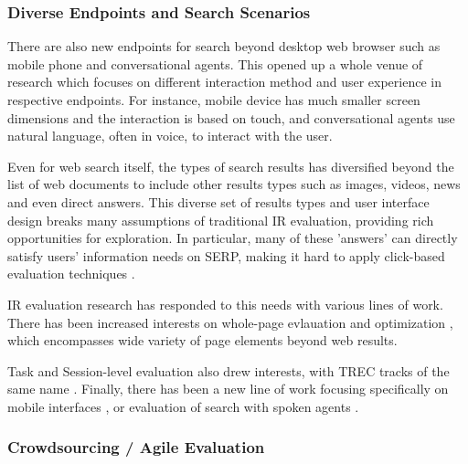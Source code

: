 \documentclass[openany]{now} %
\newcommand{\authornote}[3]{\marginpar{\tiny\color{#1}#2: #3}{\color{#1}{$\star$}}}
\newcommand{\emine}[1]{\authornote{green}{Emine}{#1}}
\newcommand{\note}[1]{\textit{(#1)}}
\begin{document}

\subsubsection{Diverse Endpoints and Search Scenarios}

There are also new endpoints for search beyond desktop web browser such as mobile phone and conversational agents. This opened up a whole venue of research which focuses on different interaction method and user experience in respective endpoints. For instance, mobile device has much smaller screen dimensions and the interaction is based on touch, and conversational agents use natural language, often in voice, to interact with the user.

Even for web search itself, the types of search results has diversified beyond the list of web documents to include other results types such as images, videos, news and even direct answers. This diverse set of results types and user interface design breaks many assumptions of traditional IR evaluation, providing rich opportunities for exploration. In particular, many of these 'answers' can directly satisfy users' information needs on SERP, making it hard to apply click-based evaluation techniques \cite{Li2009GA} \cite{diriye2012leaving}.

IR evaluation research has responded to this needs with various lines of work. There has been increased\emine{} interests on whole-page evlauation and optimization \cite{Zhou:2012}, which encompasses wide variety of page elements beyond web results. %

Task and Session-level evaluation \cite{KanoulasCCS11, CarteretteKHC14} also drew interests, with TREC tracks of the same name \cite{carterette2014overview}. Finally, there has been a new line of work focusing specifically on mobile interfaces \cite{VermaYC16}, or evaluation of search with spoken agents \cite{Kiseleva:2016}.

\subsubsection{Crowdsourcing / Agile Evaluation}
\end{document}
